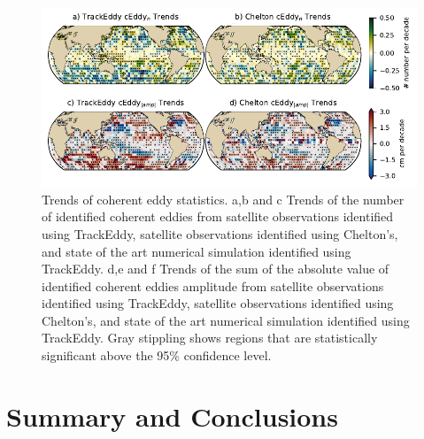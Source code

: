 \documentclass[draft,linenumbers]{agujournal2019}
\begin{document}
	\begin{figure}
	    \centering
	    \includegraphics[width=1\textwidth]{figures/all_trackeddy_trends.pdf}
	    \caption{Trends of coherent eddy statistics. a,b and c Trends of the number of identified coherent eddies from satellite observations identified using TrackEddy, satellite observations identified using Chelton's, and state of the art numerical simulation identified using TrackEddy. d,e and f Trends of the sum of the absolute value of identified coherent eddies amplitude from satellite observations identified using TrackEddy, satellite observations identified using Chelton's, and state of the art numerical simulation identified using TrackEddy. Gray stippling shows regions that are statistically significant above the 95\% confidence level.
		}
	    \label{fig:eddy_stats_trends}
	\end{figure}
	
	\section{Summary and Conclusions}	
	\label{sec:Conclusions}
	
	\acknowledgments
	
	
	
\end{document}
